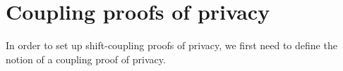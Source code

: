 \documentclass{article}
\newtheorem{definition}{Definition}[section]
\renewcommand{\epsilon}{\varepsilon}
\newcommand{\loss}{\textup{loss}}
\newcommand{\1}{\langle 1 \rangle}
\newcommand{\2}{\langle 2 \rangle}
\begin{document}










\section{Coupling proofs of privacy}

In order to set up shift-coupling proofs of privacy, we first need to define the notion of a coupling proof of privacy. 
\end{document}
